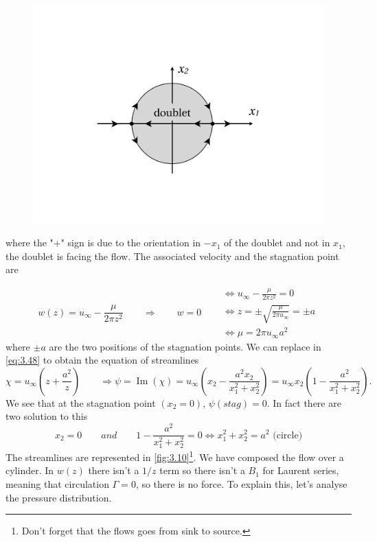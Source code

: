 	\begin{figure}
	\vspace{-15mm}	
	\includegraphics[scale=0.18]{ch3/10}	
	\label{fig:3.10}
	\end{figure}
	where the "+" sign is due to the orientation in $-x_1$ of the doublet and not in $x_1$, the doublet is facing the flow. The associated velocity and the stagnation point are 
	
	\begin{equation}
		w(z)  = u_\infty - \frac{\mu}{2\pi z^2}\qquad \Rightarrow \qquad w=0\quad \begin{aligned}
		&\Leftrightarrow  u_\infty - \frac{\mu}{2\pi z^2} = 0 \\
		&\Leftrightarrow  z = \pm\sqrt{\frac{\mu}{2\pi u_\infty}}=\pm a \\
		&\Leftrightarrow  \mu = 2\pi u_\infty a^2
		\end{aligned}
	\end{equation}
	 where $\pm a$ are the two positions of the stagnation points. We can replace in \eqref{eq:3.48} to obtain the equation of streamlines 
	\begin{equation}
		\chi = u_\infty \left( z+ \frac{a^2}{z} \right)\qquad \Rightarrow \psi = \operatorname{Im} (\chi) = u_\infty \left( x_2 - \frac{a^2x_2}{x_1^2+x_2^2}\right) = u_\infty x_2 \left( 1 - \frac{a^2}{x_1^2+x_2^2}\right) .
	\end{equation}
	We see that at the stagnation point $(x_2=0)$, $\psi (stag) = 0$. In fact there are two solution to this 
	\begin{equation}
		x_2 = 0 \qquad and \qquad 1 - \frac{a^2}{x_1^2+x_2^2} = 0  \Leftrightarrow x_1^2 +x_2^2 = a^2 \mbox{ (circle)}
	\end{equation}
	The streamlines are represented in \autoref{fig:3.10}\footnote{Don't forget that the flows goes from sink to source.}. We have composed the flow over a cylinder. In $w(z)$ there isn't a $1/z$ term so there isn't a $B_1$ for Laurent series, meaning that circulation $\Gamma = 0$, so there is no force. To explain this, let's analyse the pressure distribution.
	
